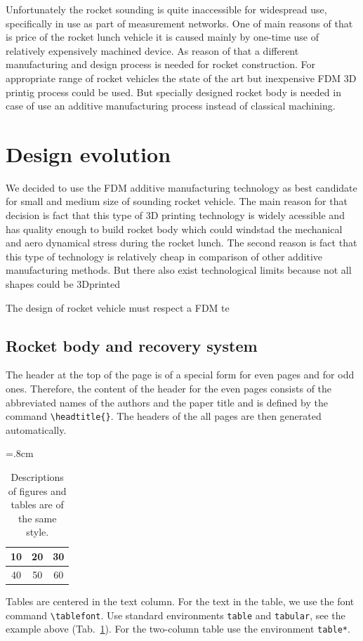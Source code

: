 \documentclass{poster16}
\begin{document}
Unfortunately the rocket sounding is quite inaccessible for widespread use, specifically in use as part of measurement networks. One of main reasons of that is price of the rocket lunch vehicle it is caused mainly by one-time use of relatively expensively machined device. 
As reason of that a different manufacturing and design process is needed for rocket construction. 
For appropriate range of rocket vehicles the state of the art but inexpensive FDM 3D printig process could be used. But specially designed rocket body is needed in case of use an additive manufacturing process instead of classical machining. 

\section{Design evolution}

We decided to use the FDM additive manufacturing technology as best candidate for small and medium size of sounding rocket vehicle. The main reason for that decision is fact that this type of 3D printing technology is widely acessible and has quality enough to build rocket body which could windstad the mechanical and aero dynamical stress during the rocket lunch. The second reason is fact that this type of technology is relatively  cheap in comparison of other additive manufacturing methods. 
But there also exist technological limits because not all shapes could be 3Dprinted

The design of rocket vehicle must respect a FDM te


\subsection{Rocket body and recovery system}
The header at the top of the page is of a special form for even pages and for odd ones. Therefore, the content of the header for the even pages consists of the abbreviated names of the authors and the paper title and is defined by the command \verb+\headtitle{}+. The headers of the all pages are then generated automatically.

%
\begin{table}[h]
\begin{center}
{\renewcommand{\arraystretch}{1.4}
\tabcolsep=.8cm
\tablefont
\begin{tabular}{|c|c|c|}
\hline
10
&20
&30\\
\hline
40
&50
&60\\
\hline
\end{tabular}}
\caption{Descriptions of figures and tables are of the same style.}
\label{tab}
\end{center}
\end{table}
Tables are centered in the text column. For the text in the table, we use the font command \verb+\tablefont+. Use standard environments \verb+table+ and \verb+tabular+, see the example above (Tab.~\ref{tab}). For the two-column table use the environment \verb+table*+. 
\end{document}
